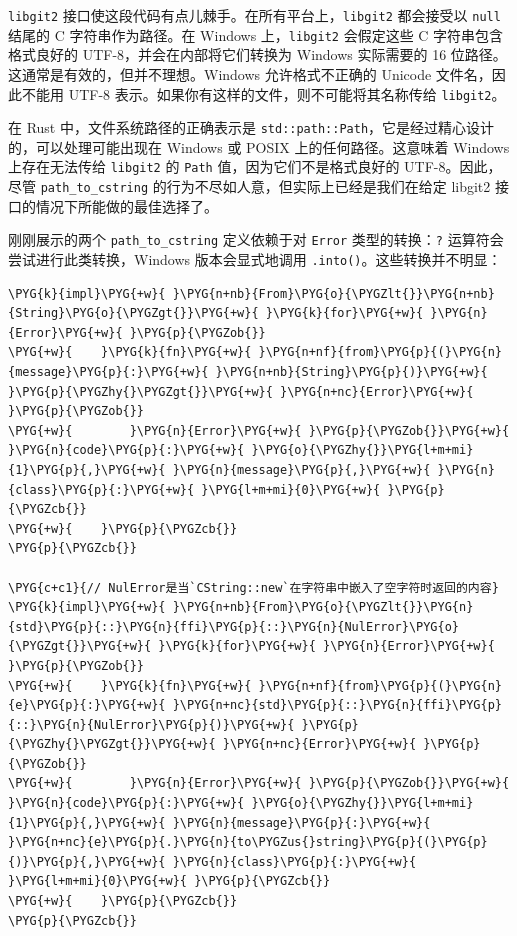 \texttt{libgit2} 接口使这段代码有点儿棘手。在所有平台上，\texttt{libgit2} 都会接受以 \texttt{null} 结尾的 C 字符串作为路径。在 Windows 上，\texttt{libgit2} 会假定这些 C 字符串包含格式良好的 UTF-8，并会在内部将它们转换为 Windows 实际需要的 16 位路径。这通常是有效的，但并不理想。Windows 允许格式不正确的 Unicode 文件名，因此不能用 UTF-8 表示。如果你有这样的文件，则不可能将其名称传给 \texttt{libgit2}。

在 Rust 中，文件系统路径的正确表示是 \texttt{std::path::Path}，它是经过精心设计的，可以处理可能出现在 Windows 或 POSIX 上的任何路径。这意味着 Windows 上存在无法传给 \texttt{libgit2} 的 \texttt{Path} 值，因为它们不是格式良好的 UTF-8。因此，尽管 \texttt{path\_to\_cstring} 的行为不尽如人意，但实际上已经是我们在给定 libgit2 接口的情况下所能做的最佳选择了。

刚刚展示的两个 \texttt{path\_to\_cstring} 定义依赖于对 \texttt{Error} 类型的转换：\texttt{?} 运算符会尝试进行此类转换，Windows 版本会显式地调用 \texttt{.into()}。这些转换并不明显：

\begin{Verbatim}[commandchars=\\\{\},breaklines=true,breakanywhere=true,fontsize=\codefont,xleftmargin=17bp]
\PYG{k}{impl}\PYG{+w}{ }\PYG{n+nb}{From}\PYG{o}{\PYGZlt{}}\PYG{n+nb}{String}\PYG{o}{\PYGZgt{}}\PYG{+w}{ }\PYG{k}{for}\PYG{+w}{ }\PYG{n}{Error}\PYG{+w}{ }\PYG{p}{\PYGZob{}}
\PYG{+w}{    }\PYG{k}{fn}\PYG{+w}{ }\PYG{n+nf}{from}\PYG{p}{(}\PYG{n}{message}\PYG{p}{:}\PYG{+w}{ }\PYG{n+nb}{String}\PYG{p}{)}\PYG{+w}{ }\PYG{p}{\PYGZhy{}\PYGZgt{}}\PYG{+w}{ }\PYG{n+nc}{Error}\PYG{+w}{ }\PYG{p}{\PYGZob{}}
\PYG{+w}{        }\PYG{n}{Error}\PYG{+w}{ }\PYG{p}{\PYGZob{}}\PYG{+w}{ }\PYG{n}{code}\PYG{p}{:}\PYG{+w}{ }\PYG{o}{\PYGZhy{}}\PYG{l+m+mi}{1}\PYG{p}{,}\PYG{+w}{ }\PYG{n}{message}\PYG{p}{,}\PYG{+w}{ }\PYG{n}{class}\PYG{p}{:}\PYG{+w}{ }\PYG{l+m+mi}{0}\PYG{+w}{ }\PYG{p}{\PYGZcb{}}
\PYG{+w}{    }\PYG{p}{\PYGZcb{}}
\PYG{p}{\PYGZcb{}}

\PYG{c+c1}{// NulError是当`CString::new`在字符串中嵌入了空字符时返回的内容}
\PYG{k}{impl}\PYG{+w}{ }\PYG{n+nb}{From}\PYG{o}{\PYGZlt{}}\PYG{n}{std}\PYG{p}{::}\PYG{n}{ffi}\PYG{p}{::}\PYG{n}{NulError}\PYG{o}{\PYGZgt{}}\PYG{+w}{ }\PYG{k}{for}\PYG{+w}{ }\PYG{n}{Error}\PYG{+w}{ }\PYG{p}{\PYGZob{}}
\PYG{+w}{    }\PYG{k}{fn}\PYG{+w}{ }\PYG{n+nf}{from}\PYG{p}{(}\PYG{n}{e}\PYG{p}{:}\PYG{+w}{ }\PYG{n+nc}{std}\PYG{p}{::}\PYG{n}{ffi}\PYG{p}{::}\PYG{n}{NulError}\PYG{p}{)}\PYG{+w}{ }\PYG{p}{\PYGZhy{}\PYGZgt{}}\PYG{+w}{ }\PYG{n+nc}{Error}\PYG{+w}{ }\PYG{p}{\PYGZob{}}
\PYG{+w}{        }\PYG{n}{Error}\PYG{+w}{ }\PYG{p}{\PYGZob{}}\PYG{+w}{ }\PYG{n}{code}\PYG{p}{:}\PYG{+w}{ }\PYG{o}{\PYGZhy{}}\PYG{l+m+mi}{1}\PYG{p}{,}\PYG{+w}{ }\PYG{n}{message}\PYG{p}{:}\PYG{+w}{ }\PYG{n+nc}{e}\PYG{p}{.}\PYG{n}{to\PYGZus{}string}\PYG{p}{(}\PYG{p}{)}\PYG{p}{,}\PYG{+w}{ }\PYG{n}{class}\PYG{p}{:}\PYG{+w}{ }\PYG{l+m+mi}{0}\PYG{+w}{ }\PYG{p}{\PYGZcb{}}
\PYG{+w}{    }\PYG{p}{\PYGZcb{}}
\PYG{p}{\PYGZcb{}}
\end{Verbatim}

